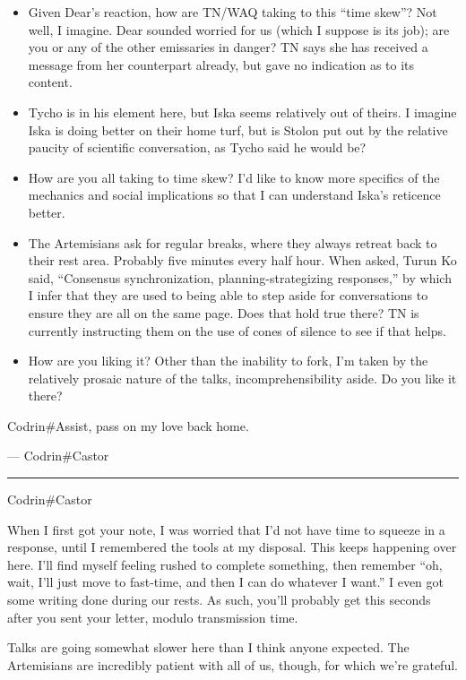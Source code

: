 \begin{itemize}
\tightlist
\item
  Given Dear's reaction, how are TN/WAQ taking to this ``time skew''? Not well, I imagine. Dear sounded worried for us (which I suppose is its job); are you or any of the other emissaries in danger? TN says she has received a message from her counterpart already, but gave no indication as to its content.
\item
  Tycho is in his element here, but Iska seems relatively out of theirs. I imagine Iska is doing better on their home turf, but is Stolon put out by the relative paucity of scientific conversation, as Tycho said he would be?
\item
  How are you all taking to time skew? I'd like to know more specifics of the mechanics and social implications so that I can understand Iska's reticence better.
\item
  The Artemisians ask for regular breaks, where they always retreat back to their rest area. Probably five minutes every half hour. When asked, Turun Ko said, ``Consensus synchronization, planning-strategizing responses,'' by which I infer that they are used to being able to step aside for conversations to ensure they are all on the same page. Does that hold true there? TN is currently instructing them on the use of cones of silence to see if that helps.
\item
  How are you liking it? Other than the inability to fork, I'm taken by the relatively prosaic nature of the talks, incomprehensibility aside. Do you like it there?
\end{itemize}

Codrin\#Assist, pass on my love back home.

— Codrin\#Castor

\begin{center}\rule{0.5\linewidth}{0.5pt}\end{center}

\noindent Codrin\#Castor

When I first got your note, I was worried that I'd not have time to squeeze in a response, until I remembered the tools at my disposal. This keeps happening over here. I'll find myself feeling rushed to complete something, then remember ``oh, wait, I'll just move to fast-time, and then I can do whatever I want.'' I even got some writing done during our rests. As such, you'll probably get this seconds after you sent your letter, modulo transmission time.

Talks are going somewhat slower here than I think anyone expected. The Artemisians are incredibly patient with all of us, though, for which we're grateful.

